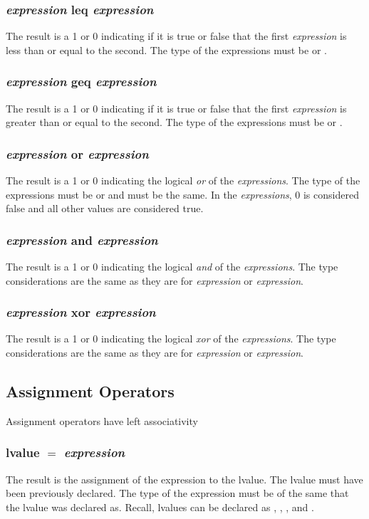 \subsubsection{\textit{expression} leq \textit{expression}}
The result is a 1 or 0 indicating if it is true or false that the first \textit{expression} is less than  or equal to the second. The type of the expressions must be \integ or \float.%
\subsubsection{\textit{expression} geq \textit{expression}}
The result is a 1 or 0 indicating if it is true or false that the first \textit{expression} is greater than or equal to the second. The type of the expressions must be \integ or \float.%
\subsubsection{\textit{expression} or \textit{expression}}
The result is a 1 or 0 indicating the logical \textit{or} of the \textit{expressions}. The type of the expressions must be \integ or \float and must be the same. In the \textit{expressions}, 0 is considered \textsf{false} and all other values are considered \textsf{true}.
\subsubsection{\textit{expression} and \textit{expression}}
The result is a 1 or 0 indicating the logical \textit{and} of the \textit{expressions}. The type considerations are the same as they are for \textit{expression} or \textit{expression}.
\subsubsection{\textit{expression} xor \textit{expression}}
The result is a 1 or 0 indicating the logical \textit{xor} of the \textit{expressions}. The type considerations are the same as they are for \textit{expression} or \textit{expression}.
\subsection{Assignment Operators}
Assignment operators have left associativity
\subsubsection{lvalue $=$ \textit{expression}}
The result is the assignment of the expression to the lvalue. The lvalue must have been previously declared. The type of the expression must be of the same that the lvalue was declared as. Recall, lvalues can be declared as \integ, \float, \complex, and \mat.
